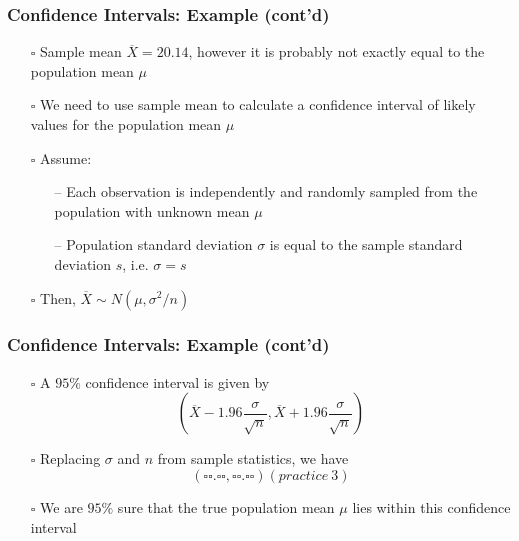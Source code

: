 \documentclass[handout]{beamer}
\begin{document}
\begin{frame}
    \frametitle{Confidence Intervals: Example (cont'd)}
    \begin{itemize}[wide = 0pt]
        \item[$\square$] Sample mean $\overline{X}=20.14$, however it is probably not exactly equal to the population mean $\mu$
        \item[$\square$] We need to use sample mean to calculate a confidence interval of likely values for the population mean $\mu$
        \item[$\square$] Assume:
        \begin{itemize}
            \item[--] Each observation is independently and randomly sampled from the population with unknown mean $\mu$
            \item[--] Population standard deviation $\sigma$ is equal to the sample standard deviation $s$, i.e. $\sigma=s$
        \end{itemize}
        \item[$\square$] Then, $\overline{X}\sim N(\mu, \sigma^2/n)$
    \end{itemize}
    \vspace*{\fill}
\end{frame}

\begin{frame}
    \frametitle{Confidence Intervals: Example (cont'd)}
    \begin{itemize}[wide = 0pt]
        \item[$\square$] A $95\%$ confidence interval is given by 
        \begin{equation*}
            (\overline{X}-1.96\frac{\sigma}{\sqrt{n}}, \overline{X}+1.96\frac{\sigma}{\sqrt{n}})
        \end{equation*}
        \item[$\square$] Replacing $\sigma$ and $n$ from sample statistics, we have
        \begin{equation*}
            (\square \square.\square \square, \square \square.\square \square)(practice \ 3)
        \end{equation*}
        \item[$\square$] We are $95\%$ sure that the true population mean $\mu$ lies within this confidence interval
    \end{itemize}
    \vspace*{\fill}
\end{frame}
\end{document}
